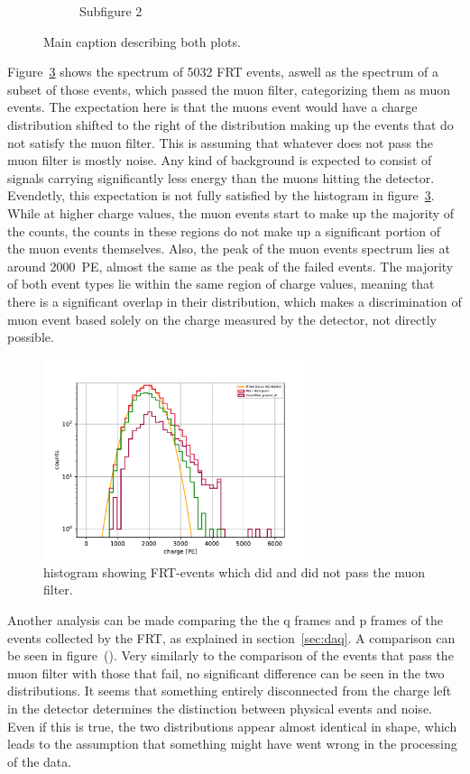 \begin{figure}[H]
\begin{subfigure}{0.49\textwidth}
        \caption{Subfigure 2}
        \label{fig:sub2}
    \end{subfigure}
    \caption{Main caption describing both plots.}
    \label{fig:frt_mu_sub_comp}
\end{figure}

Figure~\ref{fig:frt_mu_2} shows the spectrum of \num{5032} FRT events, aswell as the spectrum of a subset of those events, which passed the muon filter, categorizing 
them as muon events. The expectation here is that the muons event would have a charge distribution shifted to the right of the distribution making up the events 
that do not satisfy the muon filter. This is assuming that whatever does not pass the muon filter is mostly noise. Any kind of background is expected to consist
of signals carrying significantly less energy than the muons hitting the detector. Evendetly, this expectation is not fully satisfied by the histogram in 
figure~\ref{fig:frt_mu_2}. While at higher charge values, the muon events start to make up the majority of the counts, the counts in these regions do not make up 
a significant portion of the muon events themselves. Also, the peak of the muon events spectrum lies at around \num{2000}~PE, almost the same as the peak of the 
failed events. The majority of both event types lie within the same region of charge values, meaning that there is a significant overlap in their distribution, 
which makes a discrimination of muon event based solely on the charge measured by the detector, not directly possible. 
\begin{figure}
    \centering
    \includegraphics[width=0.7\textwidth]{Plots/frt_muon_filter.pdf}
    \caption{histogram showing FRT-events which did and did not pass the muon filter.}
    \label{fig:frt_mu_2}
\end{figure}

Another analysis can be made comparing the the q frames and p frames of the events collected by the FRT, as explained in section~\ref{sec:daq}. A comparison can be seen in 
figure~(). Very similarly to the comparison of the events that pass the muon filter with those that fail, no significant difference can be seen in the two distributions. 
It seems that something entirely disconnected from the charge left in the detector determines the distinction between physical events and noise. Even if this is true, 
the two distributions appear almost identical in shape, which leads to the assumption that something might have went wrong in the processing of the data. 

